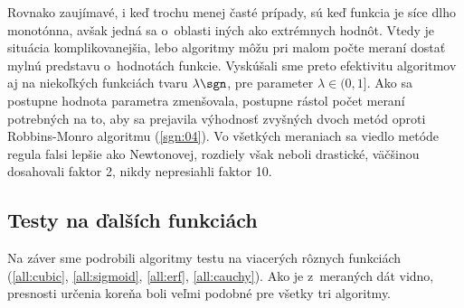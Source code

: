 Rovnako zaujímavé, i keď trochu menej časté prípady, sú keď funkcia je síce dlho
monotónna, avšak jedná sa o~oblasti iných ako extrémnych hodnôt. Vtedy je
situácia komplikovanejšia, lebo algoritmy môžu pri malom počte meraní dostať
mylnú predstavu o~hodnotách funkcie. Vyskúšali sme preto efektivitu algoritmov
aj na niekoľkých funkciách tvaru $\lambda\sgn$, pre parameter $\lambda\in(0,1]$.
Ako sa postupne hodnota parametra zmenšovala, postupne rástol počet meraní
potrebných na to, aby sa prejavila výhodnosť zvyšných dvoch metód oproti
Robbins-Monro algoritmu (\ref{sgn:04}). Vo všetkých meraniach sa viedlo metóde
regula falsi lepšie ako Newtonovej, rozdiely však neboli drastické, väčšinou
dosahovali faktor 2, nikdy nepresiahli faktor 10.

\subsection{Testy na ďalších funkciách}
Na záver sme podrobili algoritmy testu na viacerých rôznych funkciách
(\ref{all:cubic}, \ref{all:sigmoid}, \ref{all:erf}, \ref{all:cauchy}). Ako je
z~meraných dát vidno, presnosti určenia koreňa boli veľmi podobné pre všetky tri
algoritmy.
